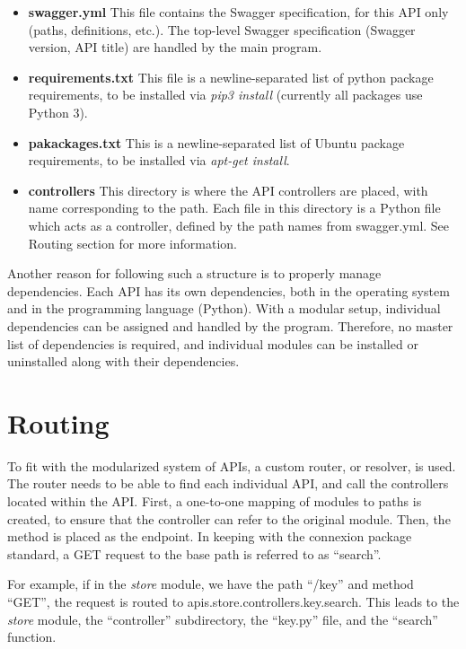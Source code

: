 \begin{itemize}
    \item\textbf{swagger.yml} This file contains the Swagger specification,
    for this API only (paths, definitions, etc.). The top-level Swagger
    specification (Swagger version, API title) are handled by the main program.

    \item\textbf{requirements.txt} This file is a newline-separated list of
    python package requirements, to be installed via \textit{pip3 install}
    (currently all packages use Python 3).

    \item\textbf{pakackages.txt} This is a newline-separated list of Ubuntu
    package requirements, to be installed via \textit{apt-get install}.

    \item\textbf{controllers} This directory is where the API controllers are
    placed, with name corresponding to the path. Each file in this directory
    is a Python file which acts as a controller, defined by the path names
    from swagger.yml. See Routing section for more information.
\end{itemize}

Another reason for following such a structure is to properly manage
dependencies. Each API has its own dependencies, both in the operating system
and in the programming language (Python). With a modular setup, individual
dependencies can be assigned and handled by the program. Therefore, no master
list of dependencies is required, and individual modules can be installed
or uninstalled along with their dependencies.

\section{Routing}

To fit with the modularized system of APIs, a custom router, or resolver,
is used. The router needs to be able to find each individual API, and call
the controllers located within the API. First, a one-to-one mapping of
modules to paths is created, to ensure that the controller can refer to the
original module. Then, the method is placed as the endpoint. In keeping with
the connexion package standard, a GET request to the base path is referred
to as ``search''.

For example, if in the \textit{store} module, we have the
path ``/key'' and method ``GET'', the request is routed to
apis.store.controllers.key.search. This leads to the \textit{store} module, the
``controller'' subdirectory, the ``key.py'' file, and the ``search'' function.


